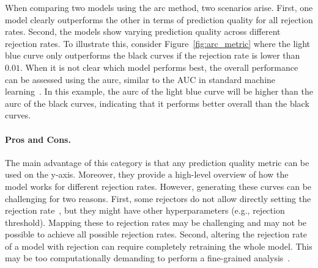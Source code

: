 When comparing two models using the \gls{arc} method, two scenarios arise. First, one model clearly outperforms the other in terms of prediction quality for all rejection rates. Second, the models show varying prediction quality across different rejection rates. To illustrate this, consider Figure~\ref{fig:arc_metric} where the light blue curve  only outperforms the black curves if the rejection rate is lower than $0.01$. When it is not clear which model performs best, the overall performance can be assessed using the \gls{aurc}, similar to the AUC in standard machine learning~\citep{Vanderlooy2006a,Vanderlooy2006,Landgrebe2006}. In this example, the \gls{aurc} of the light blue curve will be higher than the \gls{aurc} of the black curves, indicating that it performs better overall than the black curves.

\paragraph{Pros and Cons.} The main advantage of this category is that any prediction quality metric can be used on the y-axis. Moreover, they provide a high-level overview of how the model works for different rejection rates. However, generating these curves can be challenging for two reasons. 
First, some rejectors do not allow directly setting the rejection rate~\citep{Wu2007,Homenda2014}, but they might have other hyperparameters (e.g., rejection threshold). 
Mapping these to rejection rates may be challenging and may not be possible to achieve all possible rejection rates.
Second, altering the rejection rate of a model with rejection can require completely retraining the whole model. This may be too computationally demanding to perform a fine-grained analysis~\citep{Condessa2017}.


